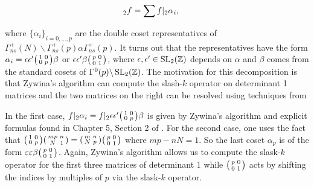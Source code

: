 \begin{align*}
[\Gamma_{ns}^+(p)\alpha\Gamma_{ns}^+(p)]_2 f = \sum f|_2\alpha_i , \hspace{5mm}
\end{align*}

where $\{ \alpha_i \}_{i = 0, \ldots, p}$ are the double coset representatives of $\Gamma_{ns}^+(N)\backslash\Gamma_{ns}^+(p)\alpha\Gamma_{ns}^+(p)$. It turns out that the representatives have the form $\alpha_i = \epsilon\epsilon'\begin{psmallmatrix} 1 & 0 \\ 0 & p \end{psmallmatrix}\beta$ or $\epsilon\epsilon' \beta \begin{psmallmatrix} p & 0 \\ 0 & 1 \end{psmallmatrix}$, where $\epsilon,\epsilon' \in \operatorname{SL}_2(\mathbb{Z})$ depends on $\alpha$ and $\beta$ comes from the standard cosets of $\Gamma^0(p)\backslash \operatorname{SL}_2(\mathbb{Z})$. The motivation for this decomposition is that Zywina's algorithm \cite{Zywina2020ComputingAO} can compute the slash-$k$ operator on determinant 1 matrices and the two matrices on the right can be resolved using techniques from \cite{Shurman}

In the first case, $f|_2 \alpha_i = f|_2 \epsilon\epsilon'\begin{psmallmatrix} 1 & 0 \\ 0 & p \end{psmallmatrix}\beta$ is given by Zywina's algorithm and explicit formulas found in Chapter 5, Section 2 of \cite{Shurman}. For the second case, one uses the fact that $\begin{psmallmatrix}
1 & 0\\
0 & p
\end{psmallmatrix}\begin{psmallmatrix}
mp &  n\\
N & 1
\end{psmallmatrix} = \begin{psmallmatrix}
m &  n\\
N & p
\end{psmallmatrix}\begin{psmallmatrix}
p & 0\\
0 & 1
\end{psmallmatrix}$ where $mp - nN = 1$. So the last coset $\alpha_p$ is of the form $\varepsilon\varepsilon\beta \begin{psmallmatrix}
p & 0 \\ 0 & 1
\end{psmallmatrix}$. Again, Zywina's algorithm allows us to compute the slask-$k$ operator for the first three matrices of determinant 1 while $\begin{psmallmatrix} p & 0 \\ 0 & 1 \end{psmallmatrix}$ acts by shifting the indices by multiples of $p$ via the slask-$k$ operator.

